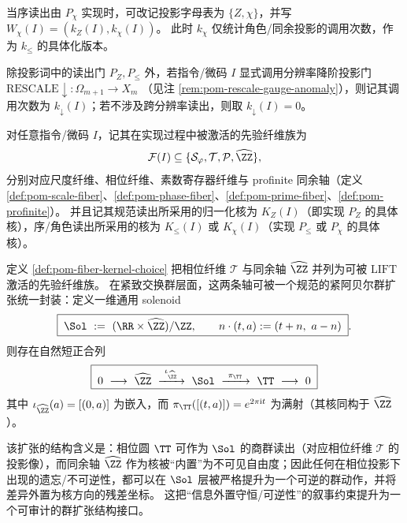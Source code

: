 \begin{remark}[角色投影的投影词记号]\label{rem:pom-word-chi}
当序读出由 $P_\chi$ 实现时，可改记投影字母表为 $\{Z,\chi\}$，并写
\(
W_\chi(I)=(k_Z(I),k_\chi(I))
\)。
此时 $k_\chi$ 仅统计角色/同余投影的调用次数，作为 $k_{\le}$ 的具体化版本。
\end{remark}

\begin{definition}[跨分辨率降阶计数]\label{def:pom-rescale-count}
除投影词中的读出门 $P_Z,P_{\le}$ 外，若指令/微码 $I$ 显式调用分辨率降阶投影门
\(
\mathrm{RESCALE}\downarrow:\Omega_{m+1}\to X_m
\)
（见注 \ref{rem:pom-rescale-gauge-anomaly}），则记其调用次数为 $k_{\downarrow}(I)$；若不涉及跨分辨率读出，则取 $k_{\downarrow}(I)=0$。
\end{definition}

\begin{definition}[纤维选择与核选择]\label{def:pom-fiber-kernel-choice}
对任意指令/微码 $I$，记其在实现过程中被激活的先验纤维族为
$$
\mathcal{F}(I)\subseteq \{\mathcal{S}_\varphi,\mathcal{T},\mathcal{P},\widehat{\ZZ}\},
$$
分别对应尺度纤维、相位纤维、素数寄存器纤维与 profinite 同余轴（定义 \ref{def:pom-scale-fiber}、\ref{def:pom-phase-fiber}、\ref{def:pom-prime-fiber}、\ref{def:pom-profinite}）。
并且记其规范读出所采用的归一化核为 $K_Z(I)$（即实现 $P_Z$ 的具体核），序/角色读出所采用的核为 $K_{\le}(I)$ 或 $K_{\chi}(I)$（实现 $P_{\le}$ 或 $P_\chi$ 的具体核）。
\end{definition}

\begin{remark}\label{rem:pom-solenoid-extension}
定义 \ref{def:pom-fiber-kernel-choice} 把相位纤维 \(\mathcal{T}\) 与同余轴 \(\widehat{\ZZ}\) 并列为可被 \(\mathrm{LIFT}\) 激活的先验纤维族。
在紧致交换群层面，这两条轴可被一个规范的紧阿贝尔群扩张统一封装：定义一维通用 solenoid
\begin{equation}\label{eq:pom-universal-solenoid-quotient}
\boxed{\;
\Sol\ :=\ (\RR\times \widehat{\ZZ})/\ZZ,\qquad
n\cdot(t,a):=(t+n,\ a-n)\; }.
\end{equation}
则存在自然短正合列
\begin{equation}\label{eq:pom-universal-solenoid-ses}
\boxed{\;
0\ \longrightarrow\ \widehat{\ZZ}\ \xrightarrow{\ \iota_{\widehat{\ZZ}}\ }\ \Sol\ \xrightarrow{\ \pi_{\TT}\ }\ \TT\ \longrightarrow\ 0\;}
\end{equation}
其中
\(
\iota_{\widehat{\ZZ}}(a)=[(0,a)]
\)
为嵌入，而
\(
\pi_{\TT}([(t,a)])=e^{2\pi \mathrm{i}t}
\)
为满射（其核同构于 \(\widehat{\ZZ}\)）。
\par
该扩张的结构含义是：相位圆 \(\TT\) 可作为 \(\Sol\) 的商群读出（对应相位纤维 \(\mathcal{T}\) 的投影像），而同余轴 \(\widehat{\ZZ}\) 作为核被“内置”为不可见自由度；因此任何在相位投影下出现的遗忘/不可逆性，都可以在 \(\Sol\) 层被严格提升为一个可逆的群动作，并将差异外置为核方向的残差坐标。
这把“信息外置守恒/可逆性”的叙事约束提升为一个可审计的群扩张结构接口。
\end{remark}

